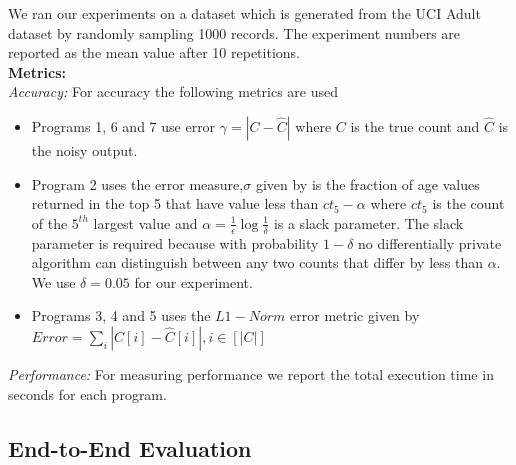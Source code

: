 We ran our experiments on a dataset which is generated from the UCI Adult dataset by randomly sampling 1000 records. The experiment numbers are reported as the mean value after 10 repetitions.
\\\textbf{Metrics:}
\\\textit{Accuracy:} For accuracy the following metrics are used
\begin{itemize}\item Programs 1, 6 and 7 use error $\gamma =|C-\hat{C}|$ where $C$ is the true count and $\hat{C}$ is the noisy  output. \item Program 2 uses the error measure,$\sigma$ given by is the fraction of age values returned in the top 5 that have value less than $ct_5-\alpha$  where  $ct_5$ is the count of the $5^{th}$ largest value and $\alpha=\frac{1}{\epsilon}\log\frac{1}{\delta}$ is a slack parameter. The slack parameter is required because with probability $1-\delta$ no differentially private algorithm can distinguish between any two counts that differ by less than $\alpha$. We use $\delta=0.05$ for our experiment. \item Programs 3, 4 and 5 uses the $L1-Norm$ error metric given  by $Error=\sum_{i}|C[i]-\hat{C}[i]|, i \in [|C|]$ \end{itemize}
\textit{Performance:} For measuring performance we report the total execution time in seconds for each program.
\subsection{End-to-End Evaluation}
